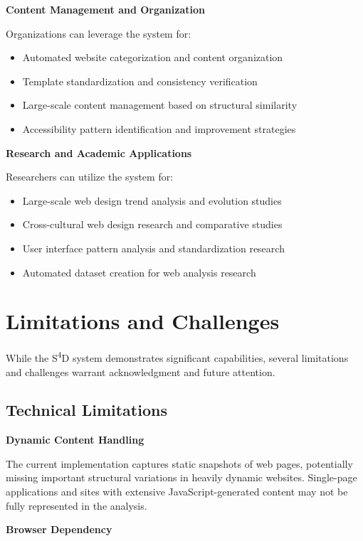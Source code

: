 \textbf{Content Management and Organization}

Organizations can leverage the system for:
\begin{itemize}
    \item Automated website categorization and content organization
    \item Template standardization and consistency verification
    \item Large-scale content management based on structural similarity
    \item Accessibility pattern identification and improvement strategies
\end{itemize}

\textbf{Research and Academic Applications}

Researchers can utilize the system for:
\begin{itemize}
    \item Large-scale web design trend analysis and evolution studies
    \item Cross-cultural web design research and comparative studies
    \item User interface pattern analysis and standardization research
    \item Automated dataset creation for web analysis research
\end{itemize}

\section{Limitations and Challenges}
\label{sec:limitations}

While the S\textsuperscript{4}D system demonstrates significant capabilities, several limitations and challenges warrant acknowledgment and future attention.

\subsection{Technical Limitations}
\label{subsec:technical-limitations}

\textbf{Dynamic Content Handling}

The current implementation captures static snapshots of web pages, potentially missing important structural variations in heavily dynamic websites. Single-page applications and sites with extensive JavaScript-generated content may not be fully represented in the analysis.

\textbf{Browser Dependency}


